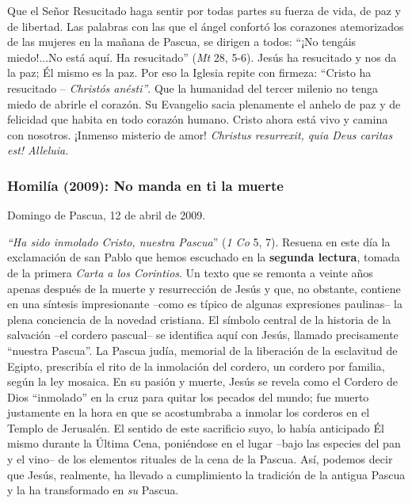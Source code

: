 			\begin{body}Que el Señor Resucitado haga sentir por todas partes su fuerza de vida, de paz y de libertad. Las palabras con las que el ángel confortó los corazones atemorizados de las mujeres en la mañana de Pascua, se dirigen a todos: “¡No tengáis miedo!...No está aquí. Ha resucitado” (\textit{Mt} 28, 5-6). Jesús ha resucitado y nos da la paz; Él mismo es la paz. Por eso la Iglesia repite con firmeza: “Cristo ha resucitado – \textit{Christós anésti”}. Que la humanidad del tercer milenio no tenga miedo de abrirle el corazón. Su Evangelio sacia plenamente el anhelo de paz y de felicidad que habita en todo corazón humano. Cristo ahora está vivo y camina con nosotros. ¡Inmenso misterio de amor! \textit{Christus resurrexit, quia Deus caritas est! Alleluia.}\end{body}
			
			\subsubsection{Homilía (2009): No manda en ti la muerte}
			
			\begin{referencia}Domingo de Pascua, 12 de abril de 2009.\end{referencia}
			
			\begin{body}\textit{“Ha sido inmolado Cristo, nuestra Pascua}” (\textit{1 Co} 5, 7). Resuena en este día la exclamación de san Pablo que hemos escuchado en la \textbf{segunda lectura}, tomada de la primera \textit{Carta a los Corintios}. Un texto que se remonta a veinte años apenas después de la muerte y resurrección de Jesús y que, no obstante, contiene en una síntesis impresionante –como es típico de algunas expresiones paulinas– la plena conciencia de la novedad cristiana. El símbolo central de la historia de la salvación –el cordero pascual– se identifica aquí con Jesús, llamado precisamente “nuestra Pascua”. La Pascua judía, memorial de la liberación de la esclavitud de Egipto, prescribía el rito de la inmolación del cordero, un cordero por familia, según la ley mosaica. En su pasión y muerte, Jesús se revela como el Cordero de Dios “inmolado” en la cruz para quitar los pecados del mundo; fue muerto justamente en la hora en que se acostumbraba a inmolar los corderos en el Templo de Jerusalén. El sentido de este sacrificio suyo, lo había anticipado Él mismo durante la Última Cena, poniéndose en el lugar –bajo las especies del pan y el vino– de los elementos rituales de la cena de la Pascua. Así, podemos decir que Jesús, realmente, ha llevado a cumplimiento la tradición de la antigua Pascua y la ha transformado en \textit{su} Pascua. \end{body}
			
